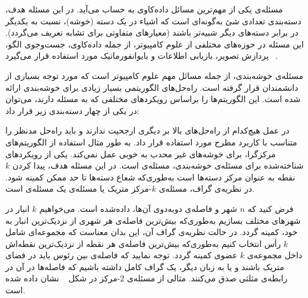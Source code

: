 


مسئله‌ی  یکی از مهم‌ترین مسائل داده‌کاوی به حساب می‌آید.
در این مسئله هدف، دسته‌بندی تعدادی شئ به‌گونه‌ای است که اشیاء در یک دسته (خوشه)، نسبت به یکدیگر در برابر دسته‌های دیگر شبیه‌تر باشند (معیارهای متفاوتی برای تشابه تعریف می‌گردد).
این مسئله در حوزه‌های مختلفی از علوم کامپیوتر، از جمله داده‌کاوی، جست‌وجوی الگو، پردازش تصویر، بازیابی اطلاعات و بایوانفورماتیک مورد استفاده قرار می‌گیرد ~.

مسئله‌ی خوشه‌بندی، از‌ جمله مسائل مهم علوم کامپیوتر است که مورد توجه بسیاری از دانشمندان قرار گرفته است.
راه‌حل‌های الگوریتمی بسیار زیادی برای خوشه‌بندی ارائه شده است.
این الگوریتم‌ها را براساس رویکرد‌های مختلفی که به مسئله دارند، می‌توان در یکی از چهار دسته‌بندی زیر قرار داد:


در عمل هیچ‌کدام از راه‌حل‌های بالا بر دیگری ارجحیت ندارند و باید راه‌حل مدنظر را متناسب با کاربرد مطرح مورد استفاده قرار داد.
به طور مثال استفاده از الگوریتم‌های مرکزگرا، برای خوشه‌های غیر محدب به خوبی عمل نمی‌کند.
یکی از رویکردهای شناخته‌شده برای مسئله‌ی خوشه‌بندی، مسئله‌ی  است.
در این مسئله هدف، پیدا کردن $k$ نقطه به عنوان مرکز دسته‌ها است به‌طوری‌که شعاع دسته‌ها تا حد ممکن کمینه شود.
در نظریه‌ی گراف، مسئله‌ی $k$-مرکز متریک یا مسئله‌ی  یک مسئله‌ی  است.

فرض کنید که $n$ شهر و فاصله‌ی دوبه‌دوی آن‌ها، داده‌شده است.
می‌خواهیم $k$ انبار در شهرهای مختلف بسازیم به‌طوری‌که بیش‌ترین فاصله‌ی هر شهری از نزدیک‌ترین انبار به خود، کمینه گردد.
در حالت نظریه‌ی گراف آن، این بدان معناست که مجموعه‌ای شامل $k$ رأس انتخاب کنیم به‌طوری‌که بیش‌ترین فاصله‌ی هر نقطه از نزدیک‌ترین نقطه‌اش داخل مجموعه‌ی $k$ عضوی کمینه گردد.
توجه نمایید که فاصله‌ی بین رئوس باید در فضای متریک باشند و یا به زبان دیگر، یک گراف کامل داشته باشیم که فاصله‌ها در آن در رابطه‌ی مثلثی صدق می‌کنند.
مثالی از مسئله‌ی $2$-مرکز در شکل ~ نشان داده شده است.

